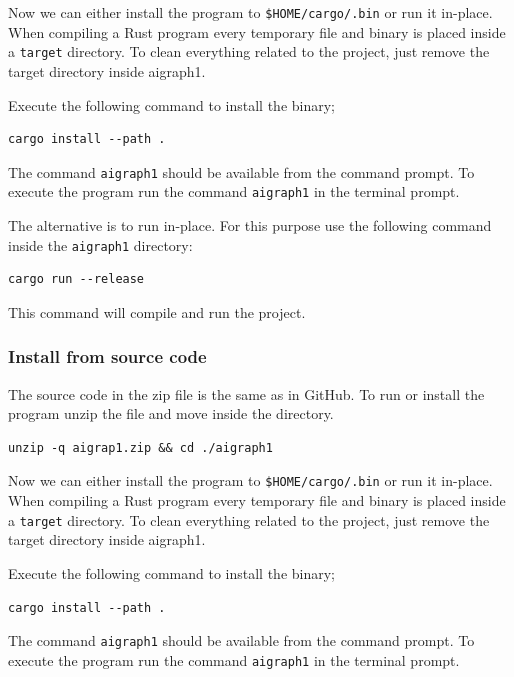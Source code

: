 Now we can either install the program to \texttt{\$HOME/cargo/.bin} or run it in-place. When compiling a 
Rust program every temporary file and binary is placed inside a \texttt{target} directory. To clean everything
related to the project, just remove the target directory inside aigraph1.

Execute the following command to install the binary;

\begin{verbatim}
cargo install --path .
\end{verbatim}

The command \texttt{aigraph1} should be available from the command prompt.
To execute the program run the command \texttt{aigraph1} in the terminal prompt.

The alternative is to run in-place. For this purpose use the following command inside the \texttt{aigraph1} directory:

\begin{verbatim}
cargo run --release
\end{verbatim}

This command will compile and run the project.

\subsubsection{Install from source code}

The source code in the zip file is the same as in GitHub. To run or install the program unzip the file and move inside the
directory.


\begin{verbatim}
unzip -q aigrap1.zip && cd ./aigraph1
\end{verbatim}


Now we can either install the program to \texttt{\$HOME/cargo/.bin} or run it in-place. When compiling a 
Rust program every temporary file and binary is placed inside a \texttt{target} directory. To clean everything
related to the project, just remove the target directory inside aigraph1.

Execute the following command to install the binary;

\begin{verbatim}
cargo install --path .
\end{verbatim}

The command \texttt{aigraph1} should be available from the command prompt.
To execute the program run the command \texttt{aigraph1} in the terminal prompt.

